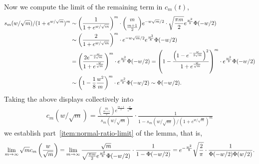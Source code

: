 %
Now we compute the limit of the remaining term in $c_m(t)$,
\begin{align*}
	s_m(w/\sqrt{m})/(1+e^{w/\sqrt{m}})^m & \sim \left({\frac{1}{1 + e^{w/\sqrt{m}}}}\right)^m  \cdot \binom{m}{\frac{m+1}{2}} e^{-w \sqrt{m}/2} \cdot \sqrt{\frac{ \pi m}{2}} e^{\frac{w^2}{8}} \Phi(-w/2) \nonumber \\
	& \sim \left({\frac{2}{1 + e^{w/\sqrt{m}}}}\right)^m \cdot  e^{-w\sqrt{m}/2} e^{\frac{w^2}{8}} \Phi(-w/2) \nonumber \\
	& =  \left({\frac{2 e^{-\frac{w}{2\sqrt{m}}}}{1 + e^{\frac{w}{\sqrt{m}}}}}\right)^m \cdot e^{\frac{w^2}{8}} \Phi(-w/2) = \left({1 - \frac{\left({1 - e^{-\frac{w}{2\sqrt{m}}}}\right)^2}{1 + e^{\frac{w}{\sqrt{m}}}}}\right)^m \cdot e^{\frac{w^2}{8}} \Phi(-w/2) \nonumber \\
	& \sim \left({1 - \frac{1}{8} \frac{w^2}{m}}\right)^m \cdot e^{\frac{w^2}{8}} \Phi(-w/2) \sim  \Phi(-w/2).
\end{align*}
Taking the above displays collectively into
\begin{align*}
	c_m(w/\sqrt{m}) = \frac{\binom{m}{\frac{m+1}{2}} e^{\frac{m-1}{2}\cdot \frac{w}{\sqrt{m}}}}{s_m(w/\sqrt{m})} \cdot \frac{1}{1 - s_m(w/\sqrt{m})/(1+e^{w/\sqrt{m}})^m}
\end{align*}
we establish part~\ref{item:normal-ratio-limit} of the lemma, that is,
\begin{align*}
	\lim_{m \to \infty} \sqrt{m} c_m \left({\frac{w}{\sqrt{m}}}\right) = \lim_{m \to \infty} \frac{\sqrt{m}}{\sqrt{\frac{ \pi m}{2}} e^{\frac{w^2}{8}} \Phi(-w/2)} \cdot \frac{1}{1 - \Phi(-w/2)} = e^{-\frac{w^2}{8}} \sqrt{\frac{2}{\pi}} \cdot \frac{1}{\Phi(-w/2) \Phi(w/2)}.
\end{align*}

